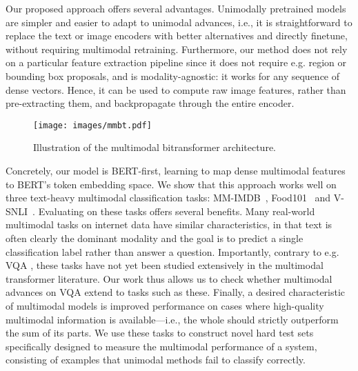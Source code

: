 \documentclass[11pt,a4paper]{article}
\begin{document}
Our proposed approach offers several advantages. Unimodally pretrained models are simpler and easier to adapt to unimodal advances, i.e., it is straightforward to replace the text or image encoders with better alternatives and directly finetune, without requiring multimodal retraining. Furthermore, our method does not rely on a particular feature extraction pipeline since it does not require e.g. region or bounding box proposals, and is modality-agnostic: it works for any sequence of dense vectors. Hence, it can be used to compute raw image features, rather than pre-extracting them, and backpropagate through the entire encoder.





\begin{figure*}[t]
    \centering
    \hspace*{-1.9cm}
    \texttt{[image: images/mmbt.pdf]}
    \caption{Illustration of the multimodal bitransformer architecture.}
    \label{fig:main}
\end{figure*}

Concretely, our model is BERT-first, learning to map dense multimodal features to BERT's token embedding space. We show that this approach works well on three text-heavy multimodal classification tasks: MM-IMDB~\cite{Arevalo:2017mmimdb}, Food101~\cite{Wang:2015food101} and V-SNLI~\cite{Vu:2018vsnli}. Evaluating on these tasks offers several benefits. Many real-world multimodal tasks on internet data have similar characteristics, in that text is often clearly the dominant modality and the goal is to predict a single classification label rather than answer a question. Importantly, contrary to e.g. VQA \cite{Antol2015vqa}, these tasks have not yet been studied extensively in the multimodal transformer literature. Our work thus allows us to check whether multimodal advances on VQA extend to tasks such as these. Finally, a desired characteristic of multimodal models is improved performance on cases where high-quality multimodal information is available---i.e., the whole should strictly outperform the sum of its parts. We use these tasks to construct novel hard test sets specifically designed to measure the multimodal performance of a system, consisting of examples that unimodal methods fail to classify correctly.
\end{document}

